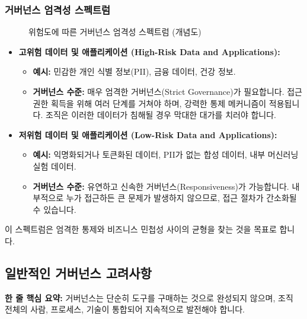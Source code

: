 \documentclass[11pt,a4paper]{article}
\theoremstyle{definition}
\begin{document}
\subsubsection*{거버넌스 엄격성 스펙트럼}
\begin{figure}[h!]
    \centering
    \caption{위험도에 따른 거버넌스 엄격성 스펙트럼 (개념도)}
    \label{fig:risk_spectrum}
\end{figure}

\begin{itemize}
    \item \textbf{고위험 데이터 및 애플리케이션 (High-Risk Data and Applications):}
    \begin{itemize}
        \item \textbf{예시:} 민감한 개인 식별 정보(PII), 금융 데이터, 건강 정보.
        \item \textbf{거버넌스 수준:} 매우 엄격한 거버넌스(Strict Governance)가 필요합니다. 접근 권한 획득을 위해 여러 단계를 거쳐야 하며, 강력한 통제 메커니즘이 적용됩니다. 조직은 이러한 데이터가 침해될 경우 막대한 대가를 치러야 합니다.
    \end{itemize}
    \item \textbf{저위험 데이터 및 애플리케이션 (Low-Risk Data and Applications):}
    \begin{itemize}
        \item \textbf{예시:} 익명화되거나 토큰화된 데이터, PII가 없는 합성 데이터, 내부 머신러닝 실험 데이터.
        \item \textbf{거버넌스 수준:} 유연하고 신속한 거버넌스(Responsiveness)가 가능합니다. 내부적으로 누가 접근하든 큰 문제가 발생하지 않으므로, 접근 절차가 간소화될 수 있습니다.
    \end{itemize}
\end{itemize}
이 스펙트럼은 엄격한 통제와 비즈니스 민첩성 사이의 균형을 찾는 것을 목표로 합니다.

\newpage
\subsection*{일반적인 거버넌스 고려사항}

\begin{keyconceptbox}
\textbf{한 줄 핵심 요약:} 거버넌스는 단순히 도구를 구매하는 것으로 완성되지 않으며, 조직 전체의 사람, 프로세스, 기술이 통합되어 지속적으로 발전해야 합니다.
\end{keyconceptbox}
\end{document}
